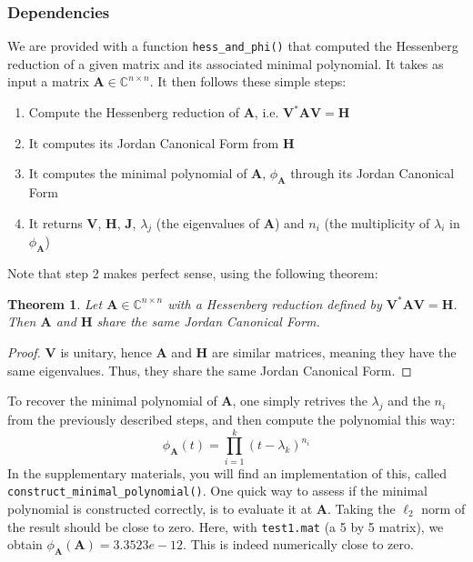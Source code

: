 \documentclass[11pt]{article}
\newtheorem{theorem}{Theorem}[section]
\numberwithin{equation}{section}
\begin{document}
\subsubsection{Dependencies}
We are provided with a function \texttt{hess\_and\_phi()} that computed the Hessenberg reduction of a given matrix and its associated minimal polynomial. It takes as input a matrix $\mathbf{A}\in\mathbb{C}^{n\times n}$. It then follows these simple steps:
\begin{enumerate}
    \item Compute the Hessenberg reduction of $\mathbf{A}$, i.e. $\mathbf{V}^*\mathbf{A}\mathbf{V} = \mathbf{H}$
    \item It computes its Jordan Canonical Form from $\mathbf{H}$
    \item It computes the minimal polynomial of $\mathbf{A}$, $\phi_{\mathbf{A}}$ through its Jordan Canonical Form
    \item It returns $\mathbf{V}$, $\mathbf{H}$, $\mathbf{J}$, $\lambda_j$ (the eigenvalues of $\mathbf{A}$) and $n_i$ (the multiplicity of $\lambda_i$ in $\phi_{\mathbf{A}}$) 
\end{enumerate}
Note that step 2 makes perfect sense, using the following theorem:
\begin{theorem}
    Let $\mathbf{A}\in\mathbb{C}^{n\times n}$ with a Hessenberg reduction defined by $\mathbf{V}^*\mathbf{A}\mathbf{V} = \mathbf{H}$. Then $\mathbf{A}$ and $\mathbf{H}$ share the same Jordan Canonical Form.
\end{theorem}
\begin{proof}
    $\mathbf{V}$ is unitary, hence $\mathbf{A}$ and $\mathbf{H}$ are similar matrices, meaning they have the same eigenvalues. Thus, they share the same Jordan Canonical Form.
\end{proof}
To recover the minimal polynomial of $\mathbf{A}$, one simply retrives the $\lambda_j$ and the $n_i$ from the previously described steps, and then compute the polynomial this way:
\begin{equation*}
    \phi_{\mathbf{A}}(t) = \prod_{i=1}^{k}(t-\lambda_k)^{n_i}
\end{equation*}
In the supplementary materials, you will find an implementation of this, called \texttt{construct\_minimal\_polynomial()}. One quick way to assess if the minimal polynomial is constructed correctly, is to evaluate it at $\mathbf{A}$. Taking the $\ell_2$ norm of the result should be close to zero. Here, with \texttt{test1.mat} (a 5 by 5 matrix), we obtain $\phi_{\mathbf{A}}(\mathbf{A}) = 3.3523e-12$. This is indeed numerically close to zero.
\end{document}
